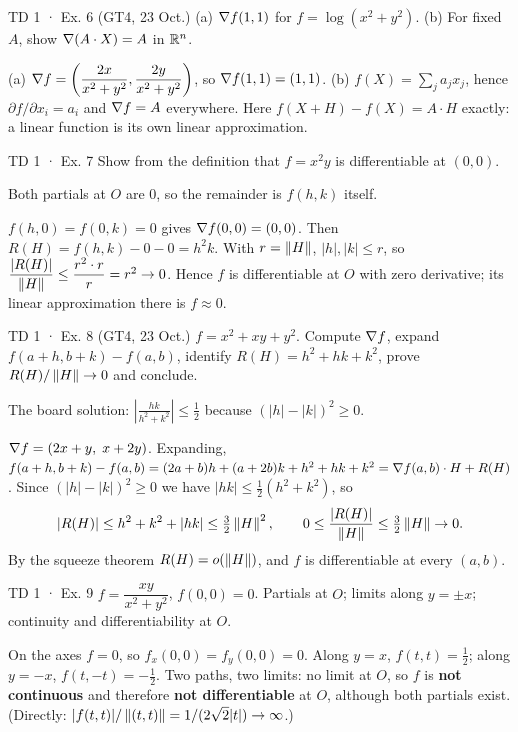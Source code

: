 \begin{problem}{TD 1 · Ex. 6 (GT4, 23 Oct.)}
(a) $\nabla f(1,1)$ for $f=\log(x^2+y^2)$. (b) For fixed $A$, show $\nabla(A\cdot X)=A$ in $\mathbb{R}^n$.
\end{problem}
\begin{solution}
(a) $\nabla f=\left(\dfrac{2x}{x^2+y^2},\dfrac{2y}{x^2+y^2}\right)$, so $\nabla f(1,1)=(1,1)$.
(b) $f(X)=\sum_j a_jx_j$, hence $\partial f/\partial x_i=a_i$ and $\nabla f=A$ everywhere. Here
$f(X+H)-f(X)=A\cdot H$ exactly: a linear function is its own linear approximation.
\end{solution}

\begin{problem}{TD 1 · Ex. 7}
Show from the definition that $f=x^2y$ is differentiable at $(0,0)$.
\end{problem}
\begin{hint}Both partials at $O$ are $0$, so the remainder is $f(h,k)$ itself.\end{hint}
\begin{solution}
$f(h,0)=f(0,k)=0$ gives $\nabla f(0,0)=(0,0)$. Then $R(H)=f(h,k)-0-0=h^2k$. With $r=\left\lVert H\right\rVert$,
$|h|,|k|\le r$, so $\dfrac{|R(H)|}{\left\lVert H\right\rVert}\le\dfrac{r^2\cdot r}{r}=r^2\to0$. Hence $f$ is
differentiable at $O$ with zero derivative; its linear approximation there is $f\approx0$.
\end{solution}

\begin{problem}{TD 1 · Ex. 8 (GT4, 23 Oct.)}
$f=x^2+xy+y^2$. Compute $\nabla f$, expand $f(a+h,b+k)-f(a,b)$, identify $R(H)=h^2+hk+k^2$,
prove $R(H)/\left\lVert H\right\rVert\to0$ and conclude.
\end{problem}
\begin{hint}The board solution: $\left|\frac{hk}{h^2+k^2}\right|\le\frac12$ because
$(|h|-|k|)^2\ge0$.\end{hint}
\begin{solution}
$\nabla f=(2x+y,\;x+2y)$. Expanding,
$f(a+h,b+k)-f(a,b)=(2a+b)h+(a+2b)k+h^2+hk+k^2=\nabla f(a,b)\cdot H+R(H)$.
Since $(|h|-|k|)^2\ge0$ we have $|hk|\le\tfrac12(h^2+k^2)$, so
\[
|R(H)|\le h^2+k^2+|hk|\le\tfrac32\left\lVert H\right\rVert^2,\qquad
0\le\frac{|R(H)|}{\left\lVert H\right\rVert}\le\tfrac32\left\lVert H\right\rVert\to0 .
\]
By the squeeze theorem $R(H)=o(\left\lVert H\right\rVert)$, and $f$ is differentiable at every $(a,b)$.
\end{solution}

\begin{problem}{TD 1 · Ex. 9}
$f=\dfrac{xy}{x^2+y^2}$, $f(0,0)=0$. Partials at $O$; limits along $y=\pm x$; continuity and
differentiability at $O$.
\end{problem}
\begin{solution}
On the axes $f=0$, so $f_x(0,0)=f_y(0,0)=0$. Along $y=x$, $f(t,t)=\tfrac12$; along $y=-x$,
$f(t,-t)=-\tfrac12$. Two paths, two limits: no limit at $O$, so $f$ is \textbf{not continuous}
and therefore \textbf{not differentiable} at $O$, although both partials exist. (Directly:
$|f(t,t)|/\left\lVert (t,t)\right\rVert=1/(2\sqrt2|t|)\to\infty$.)
\end{solution}

